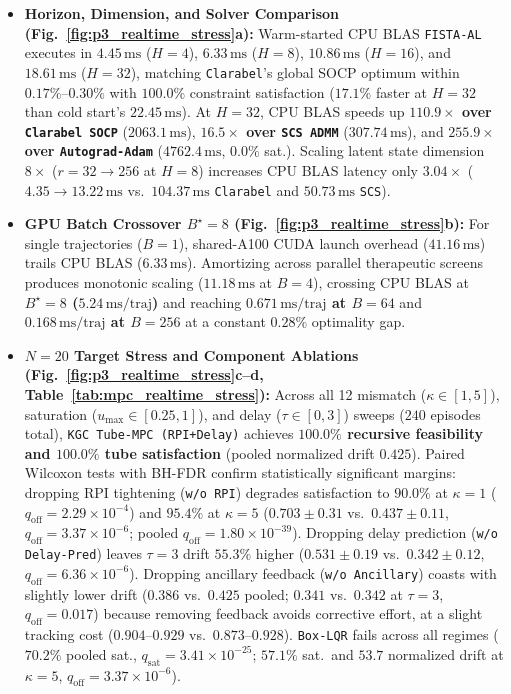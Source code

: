 \documentclass[journal]{IEEEtran}
\begin{document}
\begin{itemize}
  \item \textbf{Horizon, Dimension, and Solver Comparison (Fig.~\ref{fig:p3_realtime_stress}a):} Warm-started CPU BLAS \texttt{FISTA-AL} executes in $4.45\,\mathrm{ms}$ ($H=4$), $6.33\,\mathrm{ms}$ ($H=8$), $10.86\,\mathrm{ms}$ ($H=16$), and $18.61\,\mathrm{ms}$ ($H=32$), matching \texttt{Clarabel}'s global SOCP optimum within $0.17\%\text{--}0.30\%$ with $100.0\%$ constraint satisfaction ($17.1\%$ faster at $H=32$ than cold start's $22.45\,\mathrm{ms}$). At $H=32$, CPU BLAS speeds up \textbf{$110.9\times$ over \texttt{Clarabel SOCP}} ($2063.1\,\mathrm{ms}$), \textbf{$16.5\times$ over \texttt{SCS ADMM}} ($307.74\,\mathrm{ms}$), and \textbf{$255.9\times$ over \texttt{Autograd-Adam}} ($4762.4\,\mathrm{ms}$, $0.0\%$ sat.). Scaling latent state dimension $8\times$ ($r=32 \to 256$ at $H=8$) increases CPU BLAS latency only $3.04\times$ ($4.35 \to 13.22\,\mathrm{ms}$ vs.\ $104.37\,\mathrm{ms}$ \texttt{Clarabel} and $50.73\,\mathrm{ms}$ \texttt{SCS}).
  \item \textbf{GPU Batch Crossover $B^\star=8$ (Fig.~\ref{fig:p3_realtime_stress}b):} For single trajectories ($B=1$), shared-A100 CUDA launch overhead ($41.16\,\mathrm{ms}$) trails CPU BLAS ($6.33\,\mathrm{ms}$). Amortizing across parallel therapeutic screens produces monotonic scaling ($11.18\,\mathrm{ms}$ at $B=4$), crossing CPU BLAS at \textbf{$B^\star=8$ ($5.24\,\mathrm{ms/traj}$)} and reaching \textbf{$0.671\,\mathrm{ms/traj}$ at $B=64$} and \textbf{$0.168\,\mathrm{ms/traj}$ at $B=256$} at a constant $0.28\%$ optimality gap.
  \item \textbf{$N=20$ Target Stress and Component Ablations (Fig.~\ref{fig:p3_realtime_stress}c--d, Table~\ref{tab:mpc_realtime_stress}):} Across all 12 mismatch ($\kappa\in[1,5]$), saturation ($u_{\max}\in[0.25,1]$), and delay ($\tau\in[0,3]$) sweeps ($240$ episodes total), \texttt{KGC Tube-MPC (RPI+Delay)} achieves \textbf{$100.0\%$ recursive feasibility and $100.0\%$ tube satisfaction} (pooled normalized drift $0.425$). Paired Wilcoxon tests with BH-FDR confirm statistically significant margins: dropping RPI tightening (\texttt{w/o RPI}) degrades satisfaction to $90.0\%$ at $\kappa=1$ ($q_{\mathrm{off}}=2.29\times 10^{-4}$) and $95.4\%$ at $\kappa=5$ ($0.703\pm 0.31$ vs.\ $0.437\pm 0.11$, $q_{\mathrm{off}}=3.37\times 10^{-6}$; pooled $q_{\mathrm{off}}=1.80\times 10^{-39}$). Dropping delay prediction (\texttt{w/o Delay-Pred}) leaves $\tau=3$ drift $55.3\%$ higher ($0.531\pm 0.19$ vs.\ $0.342\pm 0.12$, $q_{\mathrm{off}}=6.36\times 10^{-6}$). Dropping ancillary feedback (\texttt{w/o Ancillary}) coasts with slightly lower drift ($0.386$ vs.\ $0.425$ pooled; $0.341$ vs.\ $0.342$ at $\tau=3$, $q_{\mathrm{off}}=0.017$) because removing feedback avoids corrective effort, at a slight tracking cost ($0.904\text{--}0.929$ vs.\ $0.873\text{--}0.928$). \texttt{Box-LQR} fails across all regimes ($70.2\%$ pooled sat., $q_{\mathrm{sat}}=3.41\times 10^{-25}$; $57.1\%$ sat.\ and $53.7$ normalized drift at $\kappa=5$, $q_{\mathrm{off}}=3.37\times 10^{-6}$).
\end{itemize}
\end{document}
